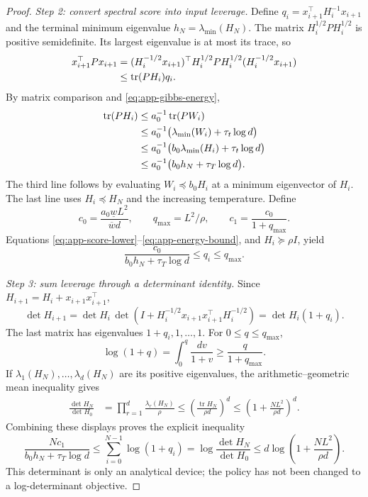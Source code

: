 \documentclass[10pt,twoside,letterpaper]{article}
\newcommand{\tr}{\operatorname{tr}}
\begin{document}
\begin{proof}
\textit{Step 2: convert spectral score into input leverage.}
Define $q_i=x_{i+1}^\top H_i^{-1}x_{i+1}$ and the terminal minimum
eigenvalue $h_N=\lambda_{\min}(H_N)$.
The matrix $H_i^{1/2}PH_i^{1/2}$ is positive semidefinite. Its largest
eigenvalue is at most its trace, so
\begin{align}
x_{i+1}^\top Px_{i+1}
&=(H_i^{-1/2}x_{i+1})^\top
 H_i^{1/2}PH_i^{1/2}(H_i^{-1/2}x_{i+1})\notag\\
&\le\tr(PH_i)q_i.
\label{eq:app-score-leverage}
\end{align}
By matrix comparison and \eqref{eq:app-gibbs-energy},
\begin{align}
\tr(PH_i)
&\le a_0^{-1}\tr(PW_i)\notag\\
&\le a_0^{-1}\big(\lambda_{\min}(W_i)+\tau_t\log d\big)\notag\\
&\le a_0^{-1}\big(b_0\lambda_{\min}(H_i)+\tau_t\log d\big)\notag\\
&\le a_0^{-1}\big(b_0h_N+\tau_T\log d\big).
\label{eq:app-energy-bound}
\end{align}
The third line follows by evaluating $W_i\preceq b_0H_i$ at a minimum
eigenvector of $H_i$. The last line uses $H_i\preceq H_N$ and the
increasing temperature. Define
\begin{equation}
c_0=\frac{a_0\underline wL^2}{\overline w d},\qquad
q_{\max}=L^2/\rho,\qquad c_1=\frac{c_0}{1+q_{\max}}.
\label{eq:app-excitation-constants}
\end{equation}
Equations \eqref{eq:app-score-lower}--\eqref{eq:app-energy-bound}, and
$H_i\succeq\rho I$, yield
\begin{equation}
\frac{c_0}{b_0h_N+\tau_T\log d}\le q_i\le q_{\max}.
\label{eq:app-leverage-lower}
\end{equation}

\textit{Step 3: sum leverage through a determinant identity.}
Since $H_{i+1}=H_i+x_{i+1}x_{i+1}^\top$,
\begin{equation}
\det H_{i+1}=\det H_i\,
\det\!\left(I+H_i^{-1/2}x_{i+1}x_{i+1}^\top H_i^{-1/2}\right)
=\det H_i(1+q_i).
\label{eq:app-determinant-update}
\end{equation}
The last matrix has eigenvalues $1+q_i,1,\ldots,1$.
For $0\le q\le q_{\max}$,
\begin{equation}
\log(1+q)=\int_0^q\frac{dv}{1+v}
\ge\frac q{1+q_{\max}}.
\label{eq:app-log-leverage}
\end{equation}
If $\lambda_1(H_N),\ldots,\lambda_d(H_N)$ are its positive eigenvalues,
the arithmetic--geometric mean inequality gives
\begin{align}
\frac{\det H_N}{\det H_0}
&=\prod_{r=1}^d\frac{\lambda_r(H_N)}\rho
\le\left(\frac{\tr H_N}{\rho d}\right)^d
\le\left(1+\frac{NL^2}{\rho d}\right)^d.
\label{eq:app-determinant-upper}
\end{align}
Combining these displays proves the explicit inequality
\begin{equation}
\frac{Nc_1}{b_0h_N+\tau_T\log d}
\le\sum_{i=0}^{N-1}\log(1+q_i)
=\log\frac{\det H_N}{\det H_0}
\le d\log\!\left(1+\frac{NL^2}{\rho d}\right).
\label{eq:app-excitation-det}
\end{equation}
This determinant is only an analytical device; the policy has not
been changed to a log-determinant objective.


\end{proof}
\end{document}
